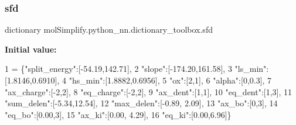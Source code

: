 \mbox{\label{namespacemolSimplify_1_1python__nn_1_1dictionary__toolbox_a20e80ba08ede10a2c9d194a313a664bd}} 
\subsubsection{\texorpdfstring{sfd}{sfd}}
{\footnotesize\ttfamily dictionary mol\+Simplify.\+python\+\_\+nn.\+dictionary\+\_\+toolbox.\+sfd}

{\bfseries Initial value\+:}
\begin{DoxyCode}
1 =  \{\textcolor{stringliteral}{"split\_energy"}:[-54.19,142.71],
2            \textcolor{stringliteral}{"slope"}:[-174.20,161.58],
3            \textcolor{stringliteral}{"ls\_min"}:[1.8146,0.6910],
4            \textcolor{stringliteral}{"hs\_min"}:[1.8882,0.6956],
5            \textcolor{stringliteral}{"ox"}:[2,1],
6            \textcolor{stringliteral}{"alpha"}:[0,0.3],
7            \textcolor{stringliteral}{"ax\_charge"}:[-2,2],
8            \textcolor{stringliteral}{"eq\_charge"}:[-2,2],
9            \textcolor{stringliteral}{"ax\_dent"}:[1,1],
10            \textcolor{stringliteral}{"eq\_dent"}:[1,3],
11            \textcolor{stringliteral}{"sum\_delen"}:[-5.34,12.54],
12            \textcolor{stringliteral}{"max\_delen"}:[-0.89, 2.09],
13            \textcolor{stringliteral}{"ax\_bo"}:[0,3],
14            \textcolor{stringliteral}{"eq\_bo"}:[0.00,3],
15            \textcolor{stringliteral}{"ax\_ki"}:[0.00, 4.29],
16            \textcolor{stringliteral}{"eq\_ki"}:[0.00,6.96]\}
\end{DoxyCode}
